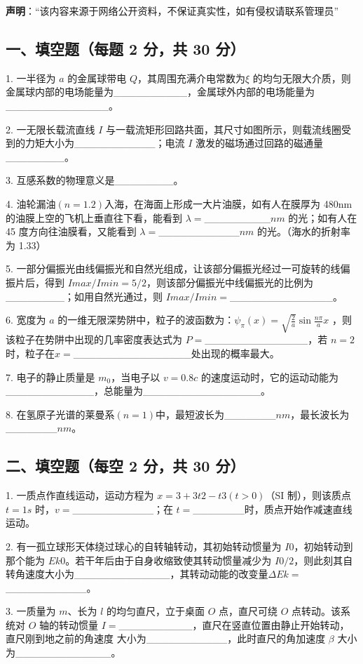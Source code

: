 
\textbf{声明}：“该内容来源于网络公开资料，不保证真实性，如有侵权请联系管理员”

\subsection{一、填空题（每题 2 分，共 30 分）}
1. 一半径为 $a$ 的金属球带电 $Q$，其周围充满介电常数为$\xi$ 的均匀无限大介质，则金属球内部的电场能量为__________，金属球外内部的电场能量为______________。

2. 一无限长载流直线 $I$ 与一载流矩形回路共面，其尺寸如图所示，则载流线圈受到的力矩大小为___________；电流 $I$ 激发的磁场通过回路的磁通量________。

3. 互感系数的物理意义是________。

4. 油轮漏油$(n=1.2)$入海，在海面上形成一大片油膜，如有人在膜厚为 480nm的油膜上空的飞机上垂直往下看，能看到 $\lambda=$_________$nm$ 的光；如有人在 45 度方向往油膜看，又能看到 $\lambda=$___________$nm$ 的光。（海水的折射率为 1.33）

5. 一部分偏振光由线偏振光和自然光组成，让该部分偏振光经过一可旋转的线偏振片后，得到 $Imax/Imin=5/2$，则该部分偏振光中线偏振光的比例为________；如用自然光通过，则 $Imax/Imin=$______________。

6. 宽度为 $a$ 的一维无限深势阱中，粒子的波函数为：$\psi_\pi(x)=\sqrt{\frac{2}{a}}\sin\frac{n \pi}{a}x$ ，则该粒子在势阱中出现的几率密度表达式为 $P=$______________，若 $n=2$ 时，粒子在$x=$________________处出现的概率最大。

7. 电子的静止质量是 $m_0$，当电子以 $v=0.8c$ 的速度运动时，它的运动动能为____________，总能量为________________。

8. 在氢原子光谱的莱曼系$(n=1)$中，最短波长为_______$nm$，最长波长为_______$nm$。
\subsection{二、填空题（每空 2 分，共 30 分）}
1. 一质点作直线运动，运动方程为 $x=3+3t2-t3(t>0)$（SI 制），则该质点 $t=1s$
时，$v=$___________；在 $t=$_______时，质点开始作减速直线运动。

2. 有一孤立球形天体绕过球心的自转轴转动，其初始转动惯量为 $I0$，初始转动到那个能为 $Ek0$。若干年后由于自身收缩致使其转动惯量减少为 $I0/2$，则此刻其自转角速度大小为_____________，其转动动能的改变量$\Delta Ek=$___________。

3. 一质量为 $m$、长为 $l$ 的均匀直尺，立于桌面 $O$ 点，直尺可绕 $O$ 点转动。该系统对 $O$ 轴的转动惯量 $I=$__________，直尺在竖直位置由静止开始转动，直尺刚到地之前的角速度 大小为___________，此时直尺的角加速度 $\beta$ 大小为_____________。

